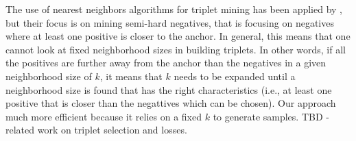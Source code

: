 The use of nearest neighbors algorithms for triplet mining has been applied by \cite{DBLP:journals/corr/KumarHC0D17}, but their focus is on mining semi-hard negatives, that is focusing on negatives where at least one positive is closer to the anchor.  In general, this means that one cannot look at fixed neighborhood sizes in building triplets.  In other words, if all the positives are further away from the anchor than the negatives in a given neighborhood size of $k$, it means that $k$ needs to be expanded until a neighborhood size is found that has the right characteristics (i.e., at least one positive that is closer than the negattives which can be chosen).   Our approach much more efficient because it relies on a fixed $k$ to generate samples.
TBD - related work on triplet selection and losses.
